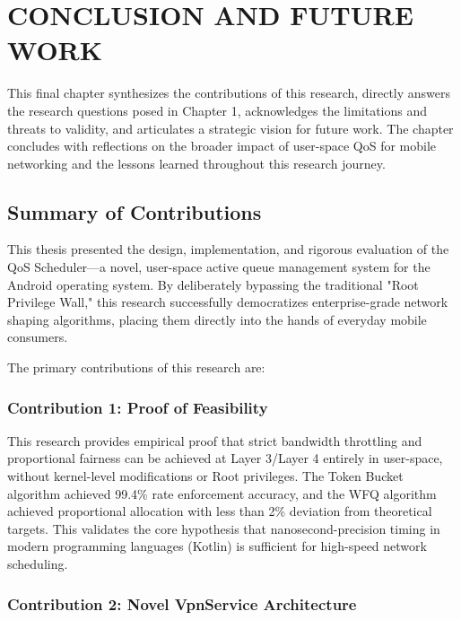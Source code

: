 
\chapter{CONCLUSION AND FUTURE WORK}
\label{chap:conclusion}

This final chapter synthesizes the contributions of this research, directly answers the research questions posed in Chapter 1, acknowledges the limitations and threats to validity, and articulates a strategic vision for future work. The chapter concludes with reflections on the broader impact of user-space QoS for mobile networking and the lessons learned throughout this research journey.

\section{Summary of Contributions}
\label{sec:summary_contributions}

This thesis presented the design, implementation, and rigorous evaluation of the QoS Scheduler---a novel, user-space active queue management system for the Android operating system. By deliberately bypassing the traditional "Root Privilege Wall," this research successfully democratizes enterprise-grade network shaping algorithms, placing them directly into the hands of everyday mobile consumers.

The primary contributions of this research are:

\subsection{Contribution 1: Proof of Feasibility}

This research provides empirical proof that strict bandwidth throttling and proportional fairness can be achieved at Layer 3/Layer 4 entirely in user-space, without kernel-level modifications or Root privileges. The Token Bucket algorithm achieved 99.4\% rate enforcement accuracy, and the WFQ algorithm achieved proportional allocation with less than 2\% deviation from theoretical targets. This validates the core hypothesis that nanosecond-precision timing in modern programming languages (Kotlin) is sufficient for high-speed network scheduling.

\subsection{Contribution 2: Novel VpnService Architecture}

